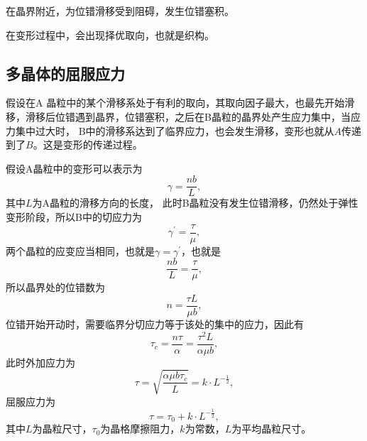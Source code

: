             在晶界附近，为位错滑移受到阻碍，发生位错塞积。

            在变形过程中，会出现择优取向，也就是织构。
        \subsection{多晶体的屈服应力}
            假设在A 晶粒中的某个滑移系处于有利的取向，其取向因子最大，也最先开始滑
            移，滑移后位错遇到晶界，位错塞积，之后在B晶粒的晶界处产生应力集中，当应力集中过大时，
            B中的滑移系达到了临界应力，也会发生滑移，变形也就从$A$传递到了$B$。这是变形的传递过程。

            假设A晶粒中的变形可以表示为
            \begin{equation}
                \gamma=\frac{nb}{L},
            \end{equation}
            其中$L$为A晶粒的滑移方向的长度，
            此时B晶粒没有发生位错滑移，仍然处于弹性变形阶段，所以B中的切应力为
            \begin{equation}
                \gamma^{\prime}=\frac{\tau}{\mu},
            \end{equation}
            两个晶粒的应变应当相同，也就是$\gamma=\gamma^{\prime}$，也就是
            \begin{equation}
                \frac{nb}{L}=\frac{\tau}{\mu},
            \end{equation}
            所以晶界处的位错数为
            \begin{equation}
                n=\frac{\tau L}{\mu b},
            \end{equation}
            位错开始开动时，需要临界分切应力等于该处的集中的应力，因此有
            \begin{equation}
                \tau_c=\frac{n\tau}{\alpha}=\frac{\tau^2L}{\alpha\mu b},
            \end{equation}
            此时外加应力为
            \begin{equation}
                \tau=\sqrt{\frac{\alpha\mu b\tau_c}{L}}=k\cdot L^{-\frac{1}{2}},
            \end{equation}
            屈服应力为
            \begin{equation}
                \tau=\tau_0+k\cdot L^{-\frac{1}{2}},
            \end{equation}
            其中$L$为晶粒尺寸，$\tau_0$为晶格摩擦阻力，$k$为常数，$L$为平均晶粒尺寸。
